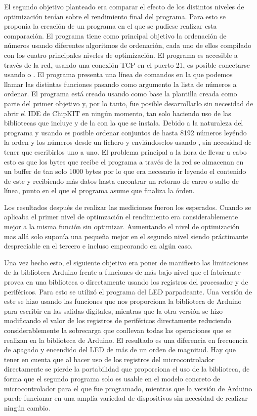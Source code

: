 El segundo objetivo planteado era comparar el efecto de los distintos niveles de optimización tenían sobre el rendimiento final del programa. Para esto se proponía la creación de un programa en el que se pudiese realizar esta comparación. El programa tiene como principal objetivo la ordenación de números usando diferentes algoritmos de ordenación, cada uno de ellos compilado con los cuatro principales niveles de optimización. El programa es accesible a través de la red, usando una conexión TCP en el puerto 21, es posible conectarse usando  o . El programa presenta una línea de comandos en la que podemos llamar las distintas funciones pasando como argumento la lista de números a ordenar. El programa está creado usando como base la plantilla creada como parte del primer objetivo y, por lo tanto, fue posible desarrollarlo sin necesidad de abrir el IDE de ChipKIT en ningún momento, tan solo haciendo uso de las bibliotecas que incluye y de la  con la que se instala. Debido a la naturaleza del programa y usando  es posible ordenar conjuntos de hasta 8192 números leyéndo la orden y los números desde un fichero y enviándoselos usando , sin necesidad de tener que escribirlos uno a uno. El problema principal a la hora de llevar a cabo esto es que los bytes que recibe el programa a través de la red se almacenan en un buffer de tan solo 1000 bytes por lo que era necesario ir leyendo el contenido de este y recibiendo más datos hasta encontrar un retorno de carro o salto de línea, punto en el que el programa asume que finaliza la órden.

Los resultados después de realizar las mediciones fueron los esperados. Cuando se aplicaba el primer nivel de optimzación el rendimiento era considerablemente mejor a la misma función sin optimizar. Aumentando el nivel de optimización mas allá solo suponía una pequeña mejor en el segundo nivel siendo práctimante despreciable en el tercero e incluso empeorando en algún caso. 

Una vez hecho esto, el siguiente objetivo era poner de manifiesto las limitaciones de la biblioteca Arduino frente a funciones de más bajo nivel que el fabricante provea en una biblioteca o directamente usando los registros del procesador y de periféricos. Para esto se utilizó el programa del LED parpadeante. Una versión de este se hizo usando las funciones que nos proporciona la biblioteca de Arduino para escribir en las salidas digitales, mientras que la otra versión se hizo modificando el valor de los registros de periféricos directamente reduciendo considerablemente la sobrecarga que conllevan todas las operaciones que se realizan en la biblioteca de Arduino. El resultado es una diferencia en frecuencia de apagado y encendido del LED de más de un orden de magnitud. Hay que tener en cuenta que al hacer uso de los registros del microcontrolador directamente se pierde la portabilidad que proporciona el uso de la biblioteca, de forma que el segundo programa solo es usable en el modelo concreto de microcontrolador para el que fue programado, mientras que la versión de Arduino puede funcionar en una amplía variedad de dispositivos sin necesidad de realizar ningún cambio.

